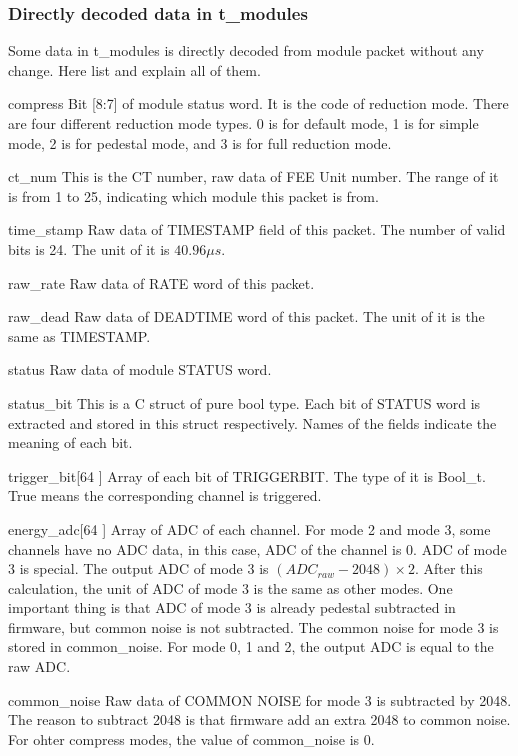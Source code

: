 \documentclass[a4paper, 12pt, onecolumn]{article}
\begin{document}
\subsubsection{Directly decoded data in t\_modules}
Some data in t\_modules is directly decoded from module packet without any change. Here list and explain all of them.

\begin{asparadesc}
\item[compress] Bit [8:7] of module status word. It is the code of reduction mode. There are four different reduction mode types.
  0 is for default mode, 1 is for simple mode, 2 is for pedestal mode, and 3 is for full reduction mode.
\item[ct\_num] This is the CT number, raw data of FEE Unit number. The range of it is from 1 to 25, indicating which module this packet is from.
\item[time\_stamp] Raw data of TIMESTAMP field of this packet. The number of valid bits is 24. The unit of it is $40.96\mu s$.
\item[raw\_rate] Raw data of RATE word of this packet.
\item[raw\_dead] Raw data of DEADTIME word of this packet. The unit of it is the same as TIMESTAMP.
\item[status] Raw data of module STATUS word.
\item[status\_bit] This is a C struct of pure bool type. Each bit of STATUS word is extracted and stored in this struct respectively.
  Names of the fields indicate the meaning of each bit.
\item[trigger\_bit[64]] Array of each bit of TRIGGERBIT. The type of it is Bool\_t. True means the corresponding channel is triggered.
\item[energy\_adc[64]] Array of ADC of each channel. For mode 2 and mode 3, some channels have no ADC data, in this case, ADC of the channel is 0.
  ADC of mode 3 is special. The output ADC of mode 3 is $(ADC_{raw} - 2048) \times 2$. After this calculation, the unit of ADC of mode 3 is the same as other modes.
  One important thing is that ADC of mode 3 is already pedestal subtracted in firmware, but common noise is not subtracted.
  The common noise for mode 3 is stored in common\_noise.
  For mode 0, 1 and 2, the output ADC is equal to the raw ADC.
\item[common\_noise] Raw data of COMMON NOISE for mode 3 is subtracted by 2048. The reason to subtract 2048 is that firmware add an extra 2048 to common noise.
  For ohter compress modes, the value of common\_noise is 0.
\end{asparadesc}
\end{document}
